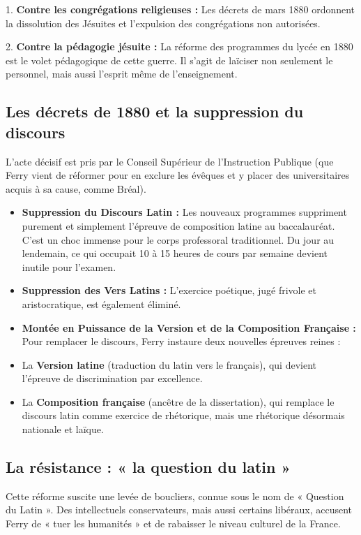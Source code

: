 1. \textbf{Contre les congrégations religieuses :} Les décrets de mars 1880 ordonnent la dissolution
des Jésuites et l'expulsion des congrégations non autorisées.

2. \textbf{Contre la pédagogie jésuite :} La réforme des programmes du lycée en 1880 est le volet
pédagogique de cette guerre. Il s'agit de laïciser non seulement le personnel, mais aussi l'esprit
même de l'enseignement.\cite{I-1-2-ref2}



\subsection{Les décrets de 1880 et la suppression du discours}

L'acte décisif est pris par le Conseil Supérieur de l'Instruction Publique (que Ferry vient de
réformer pour en exclure les évêques et y placer des universitaires acquis à sa cause, comme Bréal).

\begin{itemize}\item \textbf{Suppression du Discours Latin :} Les nouveaux programmes suppriment purement et simplement l'épreuve de composition latine au baccalauréat.\cite{I-1-2-ref25} C'est un choc immense pour le corps professoral traditionnel. Du jour au lendemain, ce qui occupait 10 à 15 heures de cours par semaine devient inutile pour l'examen.\item \textbf{Suppression des Vers Latins :} L'exercice poétique, jugé frivole et aristocratique, est également éliminé.\cite{I-1-2-ref2}\item \textbf{Montée en Puissance de la Version et de la Composition Française :} Pour remplacer le discours, Ferry instaure deux nouvelles épreuves reines :\item La \textbf{Version latine} (traduction du latin vers le français), qui devient l'épreuve de discrimination par excellence.\item La \textbf{Composition française} (ancêtre de la dissertation), qui remplace le discours latin comme exercice de rhétorique, mais une rhétorique désormais nationale et laïque.\cite{I-1-2-ref5}\end{itemize}

\subsection{La résistance : « la question du latin »}

Cette réforme suscite une levée de boucliers, connue sous le nom de « Question du Latin ». Des
intellectuels conservateurs, mais aussi certains libéraux, accusent Ferry de « tuer les humanités »
et de rabaisser le niveau culturel de la France.


